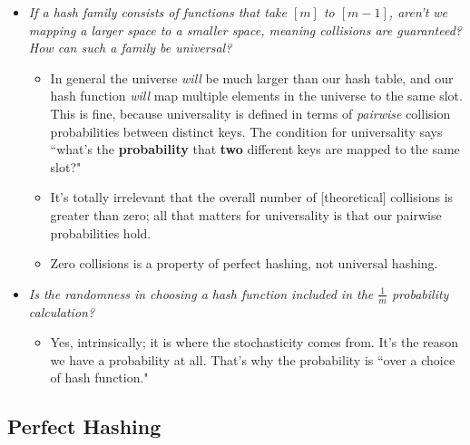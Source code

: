\documentclass[11pt]{article}
\begin{document}
\begin{itemize}
\item \textit{If a hash family consists of functions that take $[m]$ to $[m - 1]$, aren't we mapping a larger space to a smaller space, meaning collisions are guaranteed? How can such a family be universal?}
  \begin{itemize}
  \item In general the universe \textit{will} be much larger than our hash table, and our hash function \textit{will} map multiple elements in the universe to the same slot. This is fine, because universality is defined in terms of \textit{pairwise} collision probabilities between distinct keys. The condition for universality says ``what's the \textbf{probability} that \textbf{two} different keys are mapped to the same slot?"
  \item It's totally irrelevant that the overall number of [theoretical] collisions is greater than zero; all that matters for universality is that our pairwise probabilities hold.
  \item Zero collisions is a property of perfect hashing, not universal hashing.
  \end{itemize}

\item \textit{Is the randomness in choosing a hash function included in the $\frac{1}{m}$ probability calculation?}
  \begin{itemize}
  \item Yes, intrinsically; it is where the stochasticity comes from. It's the reason we have a probability at all. That's why the probability is ``over a choice of hash function."
  \end{itemize}
\end{itemize}

\subsection*{Perfect Hashing}
\end{document}

